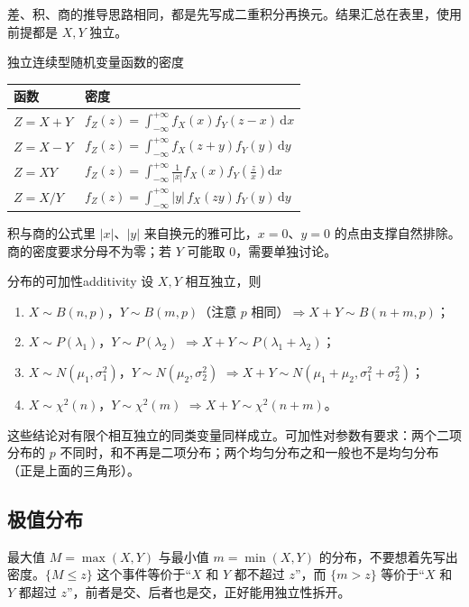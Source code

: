 差、积、商的推导思路相同，都是先写成二重积分再换元。结果汇总在表里，使用前提都是 $X,Y$ 独立。

\begin{tablebox}{独立连续型随机变量函数的密度}
\centering
\begin{tabular}{ll}
\toprule
函数 & 密度 \\
\midrule
$Z=X+Y$ & $f_Z(z)=\displaystyle\int_{-\infty}^{+\infty}f_X(x)f_Y(z-x)\,\mathrm dx$ \\[11pt]
$Z=X-Y$ & $f_Z(z)=\displaystyle\int_{-\infty}^{+\infty}f_X(z+y)f_Y(y)\,\mathrm dy$ \\[11pt]
$Z=XY$ & $f_Z(z)=\displaystyle\int_{-\infty}^{+\infty}\frac{1}{|x|}f_X(x)f_Y\!\left(\frac{z}{x}\right)\mathrm dx$ \\[11pt]
$Z=X/Y$ & $f_Z(z)=\displaystyle\int_{-\infty}^{+\infty}|y|\,f_X(zy)f_Y(y)\,\mathrm dy$ \\[11pt]
\bottomrule
\end{tabular}
\end{tablebox}

积与商的公式里 $|x|$、$|y|$ 来自换元的雅可比，$x=0$、$y=0$ 的点由支撑自然排除。商的密度要求分母不为零；若 $Y$ 可能取 $0$，需要单独讨论。

\begin{conclusion}{分布的可加性}{additivity}
设 $X,Y$ 相互独立，则
\begin{enumerate}[label=(\arabic*),leftmargin=2.2em]
\item $X\sim B(n,p)$，$Y\sim B(m,p)$（注意 $p$ 相同）$\Rightarrow X+Y\sim B(n+m,p)$；
\item $X\sim P(\lambda_1)$，$Y\sim P(\lambda_2)$ $\Rightarrow X+Y\sim P(\lambda_1+\lambda_2)$；
\item $X\sim N(\mu_1,\sigma_1^2)$，$Y\sim N(\mu_2,\sigma_2^2)$ $\Rightarrow X+Y\sim N(\mu_1+\mu_2,\sigma_1^2+\sigma_2^2)$；
\item $X\sim\chi^2(n)$，$Y\sim\chi^2(m)$ $\Rightarrow X+Y\sim\chi^2(n+m)$。
\end{enumerate}
\end{conclusion}

这些结论对有限个相互独立的同类变量同样成立。可加性对参数有要求：两个二项分布的 $p$ 不同时，和不再是二项分布；两个均匀分布之和一般也不是均匀分布（正是上面的三角形）。

\subsection{极值分布}

最大值 $M=\max(X,Y)$ 与最小值 $m=\min(X,Y)$ 的分布，不要想着先写出密度。$\{M\le z\}$ 这个事件等价于“$X$ 和 $Y$ 都不超过 $z$”，而 $\{m>z\}$ 等价于“$X$ 和 $Y$ 都超过 $z$”，前者是交、后者也是交，正好能用独立性拆开。

